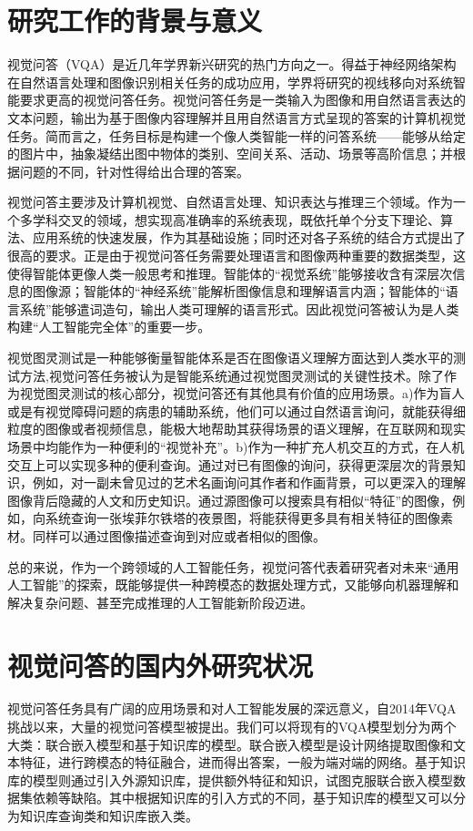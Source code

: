 \thesischapterexordium

\section{研究工作的背景与意义}

视觉问答（VQA）是近几年学界新兴研究的热门方向之一。得益于神经网络架构在自然语言处理和图像识别相关任务的成功应用，学界将研究的视线移向对系统智能要求更高的视觉问答任务。视觉问答任务是一类输入为图像和用自然语言表达的文本问题，输出为基于图像内容理解并且用自然语言方式呈现的答案的计算机视觉任务。简而言之，任务目标是构建一个像人类智能一样的问答系统——能够从给定的图片中，抽象凝结出图中物体的类别、空间关系、活动、场景等高阶信息；并根据问题的不同，针对性得给出合理的答案。

视觉问答主要涉及计算机视觉、自然语言处理、知识表达与推理三个领域。作为一个多学科交叉的领域，想实现高准确率的系统表现，既依托单个分支下理论、算法、应用系统的快速发展，作为其基础设施；同时还对各子系统的结合方式提出了很高的要求。正是由于视觉问答任务需要处理语言和图像两种重要的数据类型，这使得智能体更像人类一般思考和推理。智能体的“视觉系统”能够接收含有深层次信息的图像源；智能体的“神经系统”能解析图像信息和理解语言内涵；智能体的“语言系统”能够遣词造句，输出人类可理解的语言形式。因此视觉问答被认为是人类构建“人工智能完全体”的重要一步。

视觉图灵测试是一种能够衡量智能体系是否在图像语义理解方面达到人类水平的测试方法,视觉问答任务被认为是智能系统通过视觉图灵测试的关键性技术。除了作为视觉图灵测试的核心部分，视觉问答还有其他具有价值的应用场景。a)作为盲人或是有视觉障碍问题的病患的辅助系统，他们可以通过自然语言询问，就能获得细粒度的图像或者视频信息，能极大地帮助其获得场景的语义理解，在互联网和现实场景中均能作为一种便利的“视觉补充”。b)作为一种扩充人机交互的方式，在人机交互上可以实现多种的便利查询。通过对已有图像的询问，获得更深层次的背景知识，例如，对一副未曾见过的艺术名画询问其作者和作画背景，可以更深入的理解图像背后隐藏的人文和历史知识。通过源图像可以搜索具有相似“特征”的图像，例如，向系统查询一张埃菲尔铁塔的夜景图，将能获得更多具有相关特征的图像素材。同样可以通过图像描述查询到对应或者相似的图像。

总的来说，作为一个跨领域的人工智能任务，视觉问答代表着研究者对未来“通用人工智能”的探索，既能够提供一种跨模态的数据处理方式，又能够向机器理解和解决复杂问题、甚至完成推理的人工智能新阶段迈进。


\section{视觉问答的国内外研究状况}
视觉问答任务具有广阔的应用场景和对人工智能发展的深远意义，自2014年VQA挑战以来，大量的视觉问答模型被提出。我们可以将现有的VQA模型划分为两个大类：联合嵌入模型和基于知识库的模型。联合嵌入模型是设计网络提取图像和文本特征，进行跨模态的特征融合，进而得出答案，一般为端对端的网络。基于知识库的模型则通过引入外源知识库，提供额外特征和知识，试图克服联合嵌入模型数据集依赖等缺陷。其中根据知识库的引入方式的不同，基于知识库的模型又可以分为知识库查询类和知识库嵌入类。

